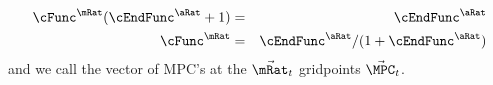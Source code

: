 \documentclass[../BufferStockTheory.tex]{subfiles}
\begin{document}
\begin{eqnarray*}
   \cFunc^{\mRat}(\cEndFunc^{\aRat}+1) & = & \cEndFunc^{\aRat}
\\ \cFunc^{\mRat} & = & \cEndFunc^{\aRat}/(1+\cEndFunc^{\aRat}) \label{eq:MPCfromMPTHC}
\end{eqnarray*}
and we call the vector of MPC's at the $\vec{\mRat}_{t}$ gridpoints $\vec{\MPC}_{t}$.
\begin{comment}

Standard polynomial interpolation methods can then be used to
construct a function that matches the level and first derivative at a
set of points; the actual solution code uses the built-in
interpolation tools of {\it Mathematica} for this purpose.

With the level and derivative of the consumption function defined at a discrete set of gridpoints,
it is possible to construct an interpolating function that is a highly accurate approximation to
the true consumption function within the grid.  But if any such interpolation is extended beyond the
boundaries defined by the minimum and maximum gridpoints, it is sure to go badly astray.


\end{comment}
\end{document}
